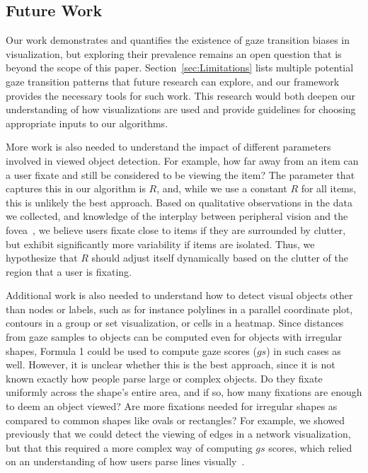 \subsection{Future Work}
\label{sec:FutureWork}
Our work demonstrates and quantifies the existence of gaze transition biases in visualization, but exploring their prevalence remains an open question that is beyond the scope of this paper. Section~\ref{sec:Limitations} lists multiple potential gaze transition patterns that future research can explore, and our framework provides the necessary tools for such work. This research would both deepen our understanding of how visualizations are used and provide guidelines for choosing appropriate inputs to our algorithms. 

More work is also needed to understand the impact of different parameters involved in viewed object detection. For example, how far away from an item can a user fixate and still be considered to be viewing the item? The parameter that captures this in our algorithm is $R$, and, while we use a constant $R$ for all items, this is unlikely the best approach. Based on qualitative observations in the data we collected,  and knowledge of the interplay between peripheral vision and the fovea~\cite{balas2009summary}, we believe users fixate close to items if they are surrounded by clutter,  but exhibit significantly more variability if items are isolated. Thus, we hypothesize that $R$ should adjust itself dynamically based on the clutter of the region that a user is fixating.  

Additional work is also needed to understand how to detect visual objects other than nodes or labels, such as for instance polylines in a parallel coordinate plot, contours in a group or set visualization, or cells in a heatmap. Since distances from gaze samples to objects can be computed even for objects with irregular shapes, Formula 1 could be used to compute gaze scores ($gs$) in such cases as well. However, it is unclear whether this is the best approach, since it is not known exactly how people parse large or complex objects. Do they fixate uniformly across the shape's entire area, and if so, how many fixations are enough to deem an object viewed? Are more fixations needed for irregular shapes as compared to common shapes like ovals or rectangles? For example, we showed previously that we could detect the viewing of edges in a network visualization, but that this required a more complex way of computing $gs$ scores, which relied on an understanding of how users parse lines visually~\cite{okoe2014gaze}.

